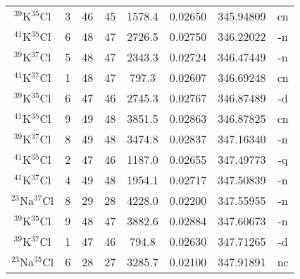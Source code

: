 \begin{table*}[htp]
\begin{tabular}{cccccccc}
$^{39}$K$^{35}$Cl & 3 & 46 & 45 & 1578.4 & 0.02650 & 345.94809 & cn \\
$^{41}$K$^{35}$Cl & 6 & 48 & 47 & 2726.5 & 0.02750 & 346.22022 & -n \\
$^{39}$K$^{37}$Cl & 5 & 48 & 47 & 2343.3 & 0.02724 & 346.47449 & -n \\
$^{41}$K$^{37}$Cl & 1 & 48 & 47 & 797.3 & 0.02607 & 346.69248 & cn \\
$^{39}$K$^{35}$Cl & 6 & 47 & 46 & 2745.3 & 0.02767 & 346.87489 & -d \\
$^{41}$K$^{35}$Cl & 9 & 49 & 48 & 3851.5 & 0.02863 & 346.87825 & cn \\
$^{39}$K$^{37}$Cl & 8 & 49 & 48 & 3474.8 & 0.02837 & 347.16340 & -n \\
$^{41}$K$^{35}$Cl & 2 & 47 & 46 & 1187.0 & 0.02655 & 347.49773 & -q \\
$^{41}$K$^{37}$Cl & 4 & 49 & 48 & 1954.1 & 0.02717 & 347.50839 & -n \\
$^{23}$Na$^{37}$Cl & 8 & 29 & 28 & 4228.0 & 0.02200 & 347.55955 & -n \\
$^{39}$K$^{35}$Cl & 9 & 48 & 47 & 3882.6 & 0.02884 & 347.60673 & -n \\
$^{39}$K$^{37}$Cl & 1 & 47 & 46 & 794.8 & 0.02630 & 347.71265 & -d \\
$^{23}$Na$^{35}$Cl & 6 & 28 & 27 & 3285.7 & 0.02100 & 347.91891 & nc \\
\hline
\end{tabular}

\par 
\end{table*}
